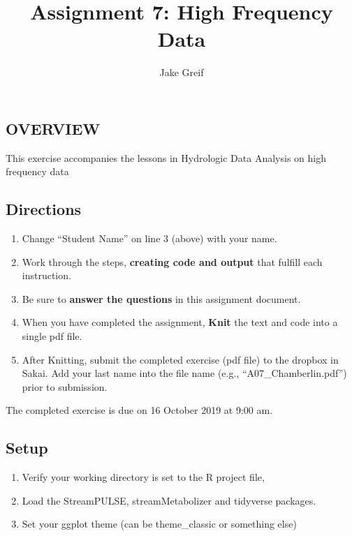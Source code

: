 \documentclass[]{article}
\title{Assignment 7: High Frequency Data}
\author{Jake Greif}
\date{}
\providecommand{\tightlist}{%
  \setlength{\itemsep}{0pt}\setlength{\parskip}{0pt}}
\begin{document}
\maketitle

\hypertarget{overview}{%
\subsection{OVERVIEW}\label{overview}}

This exercise accompanies the lessons in Hydrologic Data Analysis on
high frequency data

\hypertarget{directions}{%
\subsection{Directions}\label{directions}}

\begin{enumerate}
\def\labelenumi{\arabic{enumi}.}
\tightlist
\item
  Change ``Student Name'' on line 3 (above) with your name.
\item
  Work through the steps, \textbf{creating code and output} that fulfill
  each instruction.
\item
  Be sure to \textbf{answer the questions} in this assignment document.
\item
  When you have completed the assignment, \textbf{Knit} the text and
  code into a single pdf file.
\item
  After Knitting, submit the completed exercise (pdf file) to the
  dropbox in Sakai. Add your last name into the file name (e.g.,
  ``A07\_Chamberlin.pdf'') prior to submission.
\end{enumerate}

The completed exercise is due on 16 October 2019 at 9:00 am.

\hypertarget{setup}{%
\subsection{Setup}\label{setup}}

\begin{enumerate}
\def\labelenumi{\arabic{enumi}.}
\tightlist
\item
  Verify your working directory is set to the R project file,
\item
  Load the StreamPULSE, streamMetabolizer and tidyverse packages.
\item
  Set your ggplot theme (can be theme\_classic or something else)
\end{enumerate}
\end{document}
